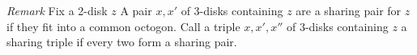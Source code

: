 \documentclass[11pt]{article}
\theoremstyle{remark}
\theoremstyle{definition}
\begin{document}
%
%
%
%
%
%
%
%
%






\noindent \emph{Remark }
Fix a 2-disk $z$
A pair ${x,x'}$ of 3-disks containing $z$ are
a sharing pair for $z$ if they fit into a common octogon.
Call a triple ${x,x',x''}$ of 3-disks containing $z$
a sharing triple if every two form a sharing pair.
\end{document}
